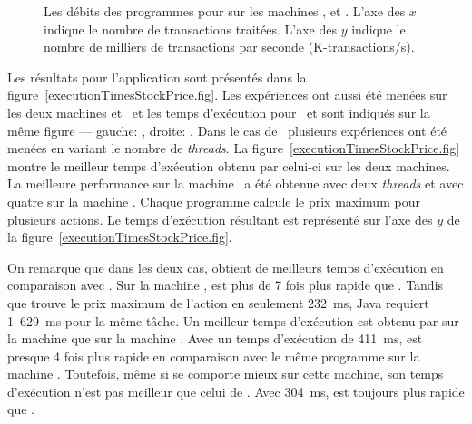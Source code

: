 \begin{figure}



\caption[Les débits pour  sur
les machines ,  et .]{Les débits des programmes
pour  sur les machines ,  et . L'axe des $x$
indique le nombre de transactions traitées. L'axe des $y$ indique le nombre de milliers de transactions par seconde (K-transactions/s).}
\label{StockPrice-debits.fig}
\end{figure}




Les r\'esultats  pour l'application  sont pr\'esent\'es dans la figure~\ref{executionTimesStockPrice.fig}. Les expériences ont aussi \'et\'e menées sur les deux machines  et~ et les temps d'ex\'ecution pour \ppff\ et  sont indiqu\'es sur la m\^eme figure --- gauche: , droite: . 
%
Dans le cas de \ppff\, plusieurs exp\'eriences ont \'et\'e men\'ees en variant le nombre de \emph{threads}. La figure~\ref{executionTimesStockPrice.fig} montre le meilleur temps d'ex\'ecution obtenu par celui-ci sur les deux machines. La meilleure performance sur la machine \ a \'et\'e obtenue avec deux \emph{threads} et avec quatre sur la machine .
%
Chaque programme calcule le prix maximum pour plusieurs actions. Le temps d'ex\'ecution r\'esultant est repr\'esent\'e sur l'axe des $y$ de la figure~\ref{executionTimesStockPrice.fig}. 

On remarque que dans les deux cas,  obtient de meilleurs temps d'ex\'ecution en comparaison avec . Sur la machine ,  est plus de 7 fois plus rapide que . Tandis que  trouve le prix maximum de l'action en seulement 232~ms, Java requiert 1~629~ms pour la m\^eme t\^ache. Un meilleur temps d'ex\'ecution est obtenu par  sur la machine  que sur la machine . Avec un temps d'ex\'ecution de 411~ms,  est presque 4 fois plus rapide en comparaison avec le m\^eme programme  sur la machine . Toutefois, m\^eme si  se comporte mieux sur cette machine, son temps d'ex\'ecution n'est pas meilleur que celui de . Avec 304~ms,  est toujours plus rapide que . 





